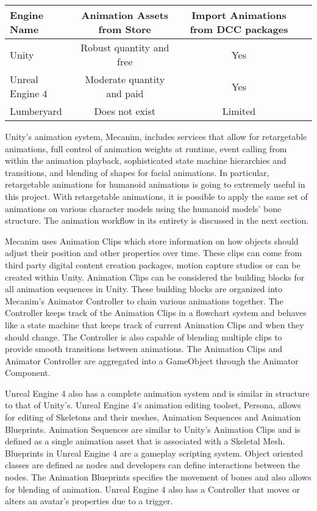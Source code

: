 \documentclass[10pt,journal,compsoc,onecolumn, draftclsnofoot]{IEEEtran}
\begin{document}
\begin{bibunit}
\vspace{2mm}
\begin{table}[h!]
\centering
  \begin{tabular}{ | l || c | c | c | }
  \hline
  Engine Name & Animation Assets from Store & Import Animations from DCC packages\\
  \hline
  Unity & Robust quantity and free &  Yes\\ \hline
  Unreal Engine 4 & Moderate quantity and paid & Yes\\ \hline
  Lumberyard & Does not exist & Limited\\ \hline
  \end{tabular}
\end{table}
\vspace{2mm}

Unity's animation system, Mecanim, includes services that allow for retargetable animations, full control of animation weights at runtime, event calling from within the animation playback, sophisticated state machine hierarchies and transitions, and blending of shapes for facial animations\cite{unity_animation}. In particular, retargetable animations for humanoid animations is going to extremely useful in this project. With retargetable animations, it is possible to apply the same set of animations on various character models using the humanoid models' bone structure. The animation workflow in its entirety is discussed in the next section.

Mecanim uses Animation Clips which store information on how objects should adjust their position and other properties over time. These clips can come from third party digital content creation packages, motion capture studios or can be created within Unity. Animation Clips can be considered the building blocks for all animation sequences in Unity. These building blocks are organized into Mecanim's Animator Controller to chain various animations together. The Controller keeps track of the Animation Clips in a flowchart system and behaves like a state machine that keeps track of current Animation Clips and when they should change. The Controller is also capable of blending multiple clips to provide smooth transitions between animations. The Animation Clips and Animator Controller are aggregated into a GameObject through the Animator Component\cite{unity_animation}.

Unreal Engine 4 also has a complete animation system and is similar in structure to that of Unity's. Unreal Engine 4's animation editing toolset, Persona, allows for editing of Skeletons and their meshes, Animation Sequences and Animation Blueprints. Animation Sequences are similar to Unity's Animation Clips and is defined as a single animation asset that is associated with a Skeletal Mesh. Blueprints in Unreal Engine 4 are a gameplay scripting system. Object oriented classes are defined as nodes and developers can define interactions between the nodes\cite{unreal_animation}. The Animation Blueprints specifies the movement of bones and also allows for blending of animation. Unreal Engine 4 also has a Controller that moves or alters an avatar's properties due to a trigger.


\end{bibunit}
\end{document}
